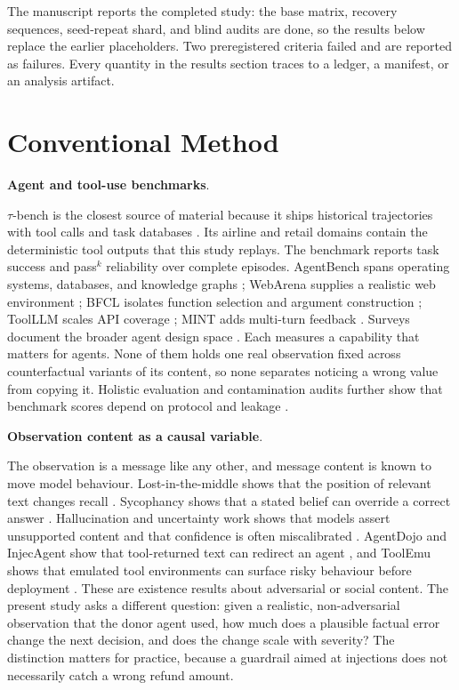 \documentclass[a4paper,fleqn]{cas-sc}
\begin{document}
The manuscript reports the completed study: the base matrix, recovery sequences, seed-repeat
shard, and blind audits are done, so the results below replace the earlier placeholders. Two
preregistered criteria failed and are reported as failures. Every quantity in the results section
traces to a ledger, a manifest, or an analysis artifact.

\section{Conventional Method}\label{sec:conventional}

\noindent\textbf{Agent and tool-use benchmarks}.\

$\tau$-bench is the closest source of material because it ships historical trajectories with
tool calls and task databases \cite{taubench}. Its airline and retail domains contain the
deterministic tool outputs that this study replays. The benchmark reports task success and
pass$^k$ reliability over complete episodes. AgentBench spans operating systems, databases, and
knowledge graphs \cite{agentbench}; WebArena supplies a realistic web environment
\cite{webarena}; BFCL isolates function selection and argument construction \cite{bfcl}; ToolLLM
scales API coverage \cite{toolllm}; MINT adds multi-turn feedback \cite{mint}. Surveys document
the broader agent design space \cite{agent_survey}. Each measures a
capability that matters for agents. None of them holds one real observation fixed across
counterfactual variants of its content, so none separates noticing a wrong value from copying
it. Holistic evaluation and contamination audits further show that benchmark scores depend on
protocol and leakage \cite{helm,contamination}.

\noindent\textbf{Observation content as a causal variable}.\

The observation is a message like any other, and message content is known to move model
behaviour. Lost-in-the-middle shows that the position of relevant text changes recall
\cite{lostmiddle}. Sycophancy shows that a stated belief can override a correct answer
\cite{sycophancy}. Hallucination and uncertainty work shows that models assert unsupported
content and that confidence is often miscalibrated
\cite{truthfulqa,halueval,selfcheckgpt,semantic_uncertainty,calibration,ovadia}. AgentDojo and
InjecAgent show that tool-returned text can redirect an agent
\cite{agentdojo,injecagent}, and ToolEmu shows that emulated tool environments can surface risky
behaviour before deployment \cite{toolemu}. These are existence results about adversarial or
social content. The present study asks a different question: given a realistic, non-adversarial
observation that the donor agent used, how much does a plausible factual error change the next
decision, and does the change scale with severity? The distinction matters for practice, because
a guardrail aimed at injections does not necessarily catch a wrong refund amount.
\end{document}
